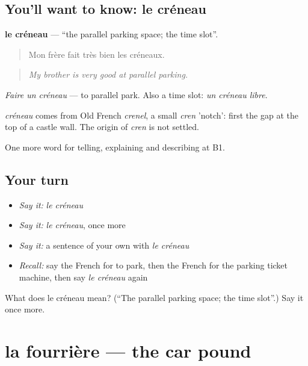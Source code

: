 \subsection*{You'll want to know: le créneau}
\textbf{le créneau} — \textquotedblleft{}the parallel parking space; the time slot\textquotedblright{}.

\begin{quote}
Mon frère fait très bien les créneaux.
\end{quote}

\begin{quote}
\emph{My brother is very good at parallel parking.}
\end{quote}

\emph{Faire un créneau} — to parallel park. Also a time slot: \emph{un créneau libre}.

\begin{cousinweb}
\emph{créneau} comes from Old French \emph{crenel}, a small \emph{cren} 'notch': first the gap at the top of a castle wall. The origin of \emph{cren} is not settled.
\end{cousinweb}

\begin{grammarlens}[title={What you've built}]
One more word for telling, explaining and describing at B1.
\end{grammarlens}

\subsection*{Your turn}
\begin{itemize}
\raggedright
  \item \emph{Say it:} \emph{le créneau}
  \item \emph{Say it:} \emph{le créneau}, once more
  \item \emph{Say it:} a sentence of your own with \emph{le créneau}
  \item \emph{Recall:} say the French for to park, then the French for the parking ticket machine, then say \emph{le créneau} again
\end{itemize}

\begin{tcolorbox}[breakable,colback=teal!4,colframe=teal!35!black,title={Before you move on}]
What does le créneau mean? (\textquotedblleft{}The parallel parking space; the time slot\textquotedblright{}.) Say it once more.
\end{tcolorbox}
\section[la fourrière]{la fourrière — the car pound}

